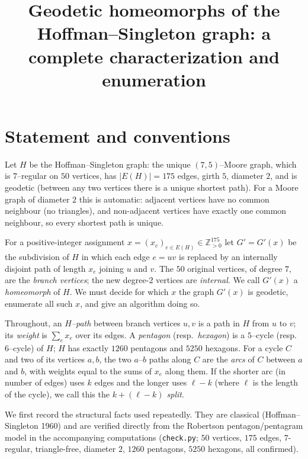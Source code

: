 \documentclass{amsart}
\theoremstyle{definition}
\begin{document}
\title{Geodetic homeomorphs of the Hoffman--Singleton graph: a complete
characterization and enumeration}
\maketitle

\section{Statement and conventions}

Let $H$ be the Hoffman--Singleton graph: the unique $(7,5)$--Moore graph, which
is $7$--regular on $50$ vertices, has $|E(H)|=175$ edges, girth $5$, diameter
$2$, and is geodetic (between any two vertices there is a unique shortest path).
For a Moore graph of diameter $2$ this is automatic: adjacent vertices have no
common neighbour (no triangles), and non-adjacent vertices have exactly one
common neighbour, so every shortest path is unique.

For a positive-integer assignment $x=(x_e)_{e\in E(H)}\in\mathbb Z_{>0}^{175}$
let $G'=G'(x)$ be the subdivision of $H$ in which each edge $e=uv$ is replaced
by an internally disjoint path of length $x_e$ joining $u$ and $v$. The $50$
original vertices, of degree $7$, are the \emph{branch vertices}; the new
degree-$2$ vertices are \emph{internal}. We call $G'(x)$ a \emph{homeomorph} of
$H$. We must decide for which $x$ the graph $G'(x)$ is geodetic, enumerate all
such $x$, and give an algorithm doing so.

Throughout, an \emph{$H$--path} between branch vertices $u,v$ is a path in $H$
from $u$ to $v$; its \emph{weight} is $\sum_{e}x_e$ over its edges. A
\emph{pentagon} (resp.\ \emph{hexagon}) is a $5$--cycle (resp.\ $6$--cycle) of
$H$; $H$ has exactly $1260$ pentagons and $5250$ hexagons. For a cycle $C$ and
two of its vertices $a,b$, the two $a$--$b$ paths along $C$ are the \emph{arcs}
of $C$ between $a$ and $b$, with weights equal to the sums of $x_e$ along them.
If the shorter arc (in number of edges) uses $k$ edges and the longer uses
$\ell-k$ (where $\ell$ is the length of the cycle), we call this the
\emph{$k{+}(\ell-k)$ split}.

We first record the structural facts used repeatedly. They are classical
(Hoffman--Singleton 1960) and are verified directly from the Robertson
pentagon/pentagram model in the accompanying computations (\texttt{check.py};
$50$ vertices, $175$ edges, $7$-regular, triangle-free, diameter $2$,
$1260$ pentagons, $5250$ hexagons, all confirmed).
\end{document}
